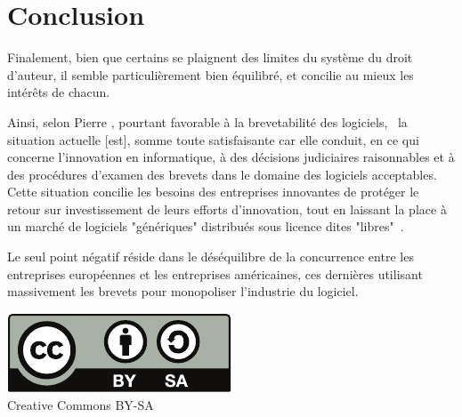 \documentclass[pdftex,a4paper,11pt]{report}
\begin{document}
\chapter*{Conclusion}
Finalement, bien que certains se plaignent des limites du système du droit d'auteur, il semble particulièrement bien équilibré, et concilie au mieux les intérêts de chacun.

Ainsi, selon Pierre , pourtant favorable à la brevetabilité des logiciels, \og~la situation  actuelle [est], somme toute satisfaisante car elle conduit, en ce qui concerne l'innovation en informatique, à des décisions judiciaires raisonnables et à des procédures d'examen des brevets dans le domaine des logiciels acceptables. Cette situation concilie les besoins des entreprises innovantes de protéger le retour sur investissement de leurs efforts d'innovation, tout en laissant la place à un marché de logiciels "génériques" distribués sous licence dites "libres"~\fg.

Le seul point négatif réside dans le déséquilibre de la concurrence entre les entreprises européennes et les entreprises américaines, ces dernières utilisant massivement les brevets pour monopoliser l'industrie du logiciel.

\tableofcontents

\clearpage

\begin{center}
    \href{http://creativecommons.org/licenses/by-sa/2.0/fr/}{\includegraphics[width=.30\linewidth]{images/cc_by_sa}}\\
	Creative Commons BY-SA
\end{center}
\end{document}
